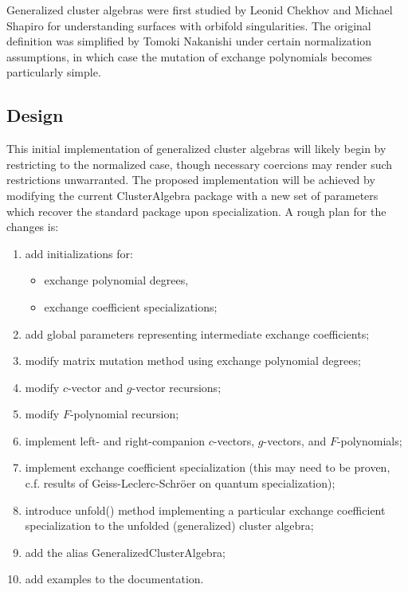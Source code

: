 \documentclass{amsart}
\begin{document}
  Generalized cluster algebras were first studied by Leonid Chekhov and Michael Shapiro for understanding surfaces with orbifold singularities.
  The original definition was simplified by Tomoki Nakanishi under certain normalization assumptions, in which case the mutation of exchange polynomials becomes particularly simple.

  \subsection*{Design}
  This initial implementation of generalized cluster algebras will likely begin by restricting to the normalized case, though necessary coercions may render such restrictions unwarranted. 
  The proposed implementation will be achieved by modifying the current ClusterAlgebra package with a new set of parameters which recover the standard package upon specialization.
  A rough plan for the changes is:
  \begin{enumerate}
    \item add initializations for:
      \begin{itemize}
        \item exchange polynomial degrees,
        \item exchange coefficient specializations;
      \end{itemize}
    \item add global parameters representing intermediate exchange coefficients;
    \item modify matrix mutation method using exchange polynomial degrees;
    \item modify $c$-vector and $g$-vector recursions;
    \item modify $F$-polynomial recursion;
    \item implement left- and right-companion $c$-vectors, $g$-vectors, and $F$-polynomials;
    \item implement exchange coefficient specialization (this may need to be proven, c.f. results of Geiss-Leclerc-Schr\"oer on quantum specialization);
    \item introduce unfold() method implementing a particular exchange coefficient specialization to the unfolded (generalized) cluster algebra;
    \item add the alias GeneralizedClusterAlgebra;
    \item add examples to the documentation.
  \end{enumerate}
\end{document}
